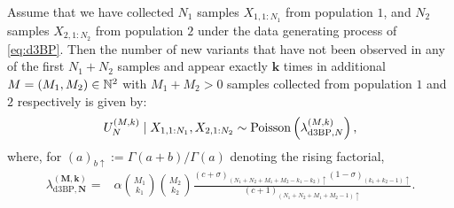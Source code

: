 \begin{myProposition}
	
    Assume that we have collected $N_1$ samples $X_{1, 1:N_1}$ from population $1$, and $N_2$ samples $X_{2, 1:N_2}$ from population $2$ under the data generating process of \cref{eq:d3BP}. Then the number of new variants that have not been observed in any of the first $N_1+N_2$ samples and appear exactly $\bm{k}$ times in additional $\bm{M} = (M_1, M_2) \in \NN^{2}$ with $M_1+M_2 >0$ samples collected from population $1$ and $2$ respectively is given by:
    \label{prop:kr_ton_diag}
    \begin{align*}
        \news{\bm{N}}{\bm{M}, \bm{k}} \mid X_{1,1:N_1},X_{2,1:N_2} \sim \Poisson\left(\lambda^{(\bm{M},\bm{k})}_{\mathrm{d3BP},\bm{N}}\right),
    \end{align*} 
    where, for $(a)_{b\uparrow}:=\Gamma(a+b)/\Gamma(a)$ denoting the rising factorial,
    \begin{align*}
        \lambda^{(\bm{M},\bm{k})}_{\mathrm{d3BP},\bm{N}}=&\alpha \binom{M_1}{k_1}\binom{M_2}{k_2} \frac{(c+\sigma)_{(N_1+N_2+M_1+M_2-k_1-k_2)\uparrow }(1-\sigma)_{(k_1+k_2-1)\uparrow}}{(c+1)_{(N_1+N_2+M_1+M_2-1)\uparrow }}.
            \end{align*}
\end{myProposition}

